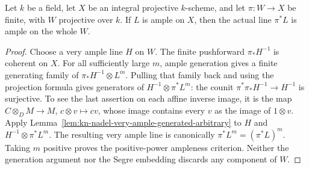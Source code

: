 \begin{proposition}
\label{prop:kn-nadel-finite-ample-pullback}
\leanok
Let $k$ be a field, let $X$ be an integral projective $k$-scheme, and let
$\pi:W\to X$ be finite, with $W$ projective over $k$.  If $L$ is ample
on $X$, then the actual line $\pi^*L$ is ample on the whole $W$.
\end{proposition}
\begin{proof}
Choose a very ample line $H$ on $W$.  The finite pushforward
$\pi_*H^{-1}$ is coherent on $X$.  For all sufficiently large $m$,
ample generation gives a finite generating family of
$\pi_*H^{-1}\otimes L^m$.  Pulling that family back and using the
projection formula gives generators of $H^{-1}\otimes\pi^*L^m$:
the counit $\pi^*\pi_*H^{-1}\to H^{-1}$ is surjective.  To see the
last assertion on each affine inverse image, it is the map
$C\otimes_D M\to M$, $c\otimes v\mapsto cv$, whose image contains
every $v$ as the image of $1\otimes v$.
Apply Lemma~\ref{lem:kn-nadel-very-ample-generated-arbitrary} to $H$
and $H^{-1}\otimes\pi^*L^m$.  The resulting very ample line is
canonically $\pi^*L^m=(\pi^*L)^m$.  Taking $m$ positive proves the
positive-power ampleness criterion.  Neither the generation argument
nor the Segre embedding discards any component of $W$.
\end{proof}
